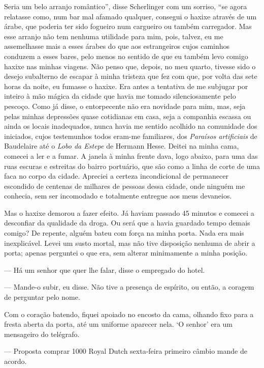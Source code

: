Seria um belo arranjo romântico'', disse Scherlinger com um sorriso,
``se agora relatasse como, num bar mal afamado qualquer, consegui o
haxixe através de um árabe, que poderia ter sido fogueiro num cargueiro
ou também carregador. Mas esse arranjo não tem nenhuma utilidade para
mim, pois, talvez, eu me assemelhasse mais a esses árabes do que aos
estrangeiros cujos caminhos conduzem a esses bares, pelo menos no
sentido de que eu também levo comigo haxixe nas minhas viagens. Não
penso que, depois, no meu quarto, tivesse sido o desejo subalterno de
escapar à minha tristeza que fez com que, por volta das sete horas da
noite, eu fumasse o haxixe. Era antes a tentativa de me subjugar por
inteiro à mão mágica da cidade que havia me tomado silenciosamente pelo
pescoço. Como já disse, o entorpecente não era novidade para mim, mas,
seja pelas minhas depressões quase cotidianas em casa, seja a companhia
escassa ou ainda os locais inadequados, nunca havia me sentido acolhido
na comunidade dos iniciados, cujos testemunhos todos eram-me familiares,
dos \emph{Paraísos artificiais} de Baudelaire até o \emph{Lobo da
Estepe} de Hermann Hesse. Deitei na minha cama, comecei a ler e a fumar.
A janela à minha frente dava, logo abaixo, para uma das ruas escuras e
estreitas do bairro portuário, que são como a linha de corte de uma faca
no corpo da cidade. Apreciei a certeza incondicional de permanecer
escondido de centenas de milhares de pessoas dessa cidade, onde ninguém
me conhecia, sem ser incomodado e totalmente entregue aos meus
devaneios.

Mas o haxixe demorou a fazer efeito. Já haviam passado 45 minutos e
comecei a desconfiar da qualidade da droga. Ou será que a havia guardado
tempo demais comigo? De repente, alguém bateu com força na minha porta.
Nada era mais inexplicável. Levei um susto mortal, mas não tive
disposição nenhuma de abrir a porta; apenas perguntei o que era, sem
alterar minimamente a minha posição.

--- Há um senhor que quer lhe falar, disse o empregado do hotel.

--- Mande-o subir, eu disse. Não tive a presença de espírito, ou então, a
coragem de perguntar pelo nome.

Com o coração batendo, fiquei apoiado no encosto da cama, olhando fixo
para a fresta aberta da porta, até um uniforme aparecer nela. `O senhor'
era um mensageiro do telégrafo.

--- Proposta comprar 1000 Royal Dutch sexta-feira primeiro câmbio mande
de acordo.


